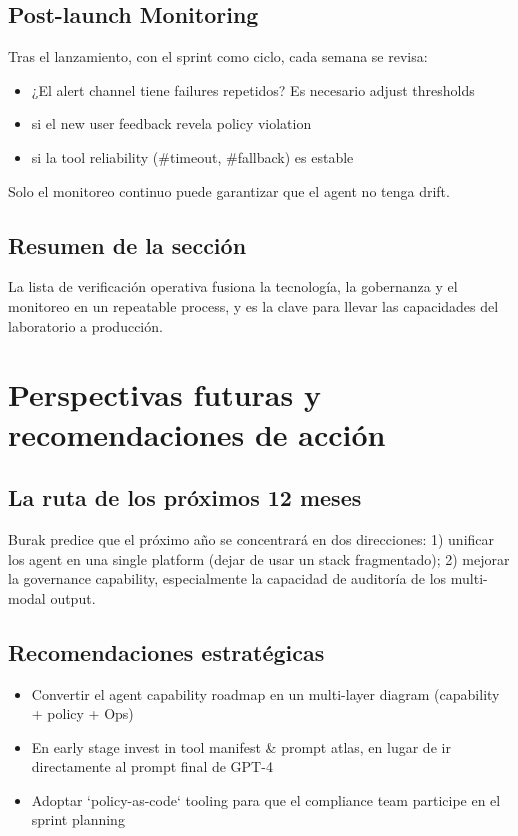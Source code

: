 \documentclass[a4paper]{article}
\begin{document}
\subsection{Post-launch Monitoring}

Tras el lanzamiento, con el sprint como ciclo, cada semana se revisa:

\begin{itemize}
    \item ¿El alert channel tiene failures repetidos? Es necesario adjust thresholds
    \item si el new user feedback revela policy violation
    \item si la tool reliability (\#timeout, \#fallback) es estable
\end{itemize}

Solo el monitoreo continuo puede garantizar que el agent no tenga drift.

\subsection{Resumen de la sección}

La lista de verificación operativa fusiona la tecnología, la gobernanza y el monitoreo en un repeatable process, y es la clave para llevar las capacidades del laboratorio a producción.

\section{Perspectivas futuras y recomendaciones de acción}

\subsection{La ruta de los próximos 12 meses}

Burak predice que el próximo año se concentrará en dos direcciones: 1) unificar los agent en una single platform (dejar de usar un stack fragmentado); 2) mejorar la governance capability, especialmente la capacidad de auditoría de los multi-modal output.

\subsection{Recomendaciones estratégicas}

\begin{itemize}
    \item Convertir el agent capability roadmap en un multi-layer diagram (capability + policy + Ops)
    \item En early stage invest in tool manifest \& prompt atlas, en lugar de ir directamente al prompt final de GPT-4
    \item Adoptar `policy-as-code` tooling para que el compliance team participe en el sprint planning
\end{itemize}
\end{document}
